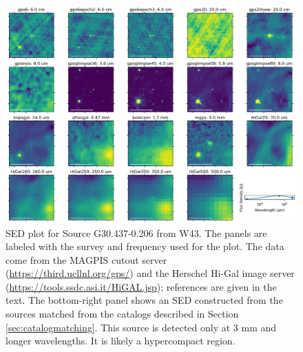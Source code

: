 \documentclass[twocolumn]{aastex62}
\begin{document}
\begin{figure}[htp]
    \includegraphics[width=17cm]{figures/SED_plot_G30.437-0.206.png}
    \caption{SED plot for Source G30.437-0.206 from W43.  The panels are
    labeled with the survey and frequency used for the plot.  The data come
    from the MAGPIS cutout server (\url{https://third.ucllnl.org/gps/}) and the
    Herschel Hi-Gal image server (\url{https://tools.ssdc.asi.it/HiGAL.jsp});
    references are given in the text.  The bottom-right panel shows an SED
    constructed from the sources matched from the catalogs described in Section
    \ref{sec:catalogmatching}.  This source is detected only at 3 mm and longer
    wavelengths.  It is likely a hypercompact \hii region.}
\label{fig:sed83}
\end{figure}


\end{document}
